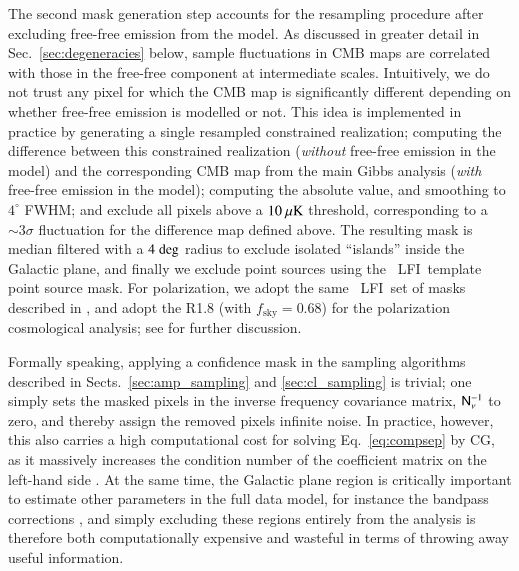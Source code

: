 \documentclass[twocolumn]{aa}
\newcommand{\N}[0]{\tens{N}}
\newcommand{\lfi}[0]{LFI}
\begin{document}
The second mask generation step accounts for the resampling procedure
after excluding free-free emission from the model. As discussed in greater detail in Sec.~\ref{sec:degeneracies} below, sample fluctuations in CMB maps are correlated with those in the free-free component at intermediate scales. Intuitively, we do 
not trust any pixel for which the CMB map is significantly different
depending on whether free-free emission is modelled or not. This idea
is implemented in practice by generating a single resampled
constrained realization; computing the difference between this
constrained realization (\emph{without} free-free emission in the
model) and the corresponding CMB map from the main Gibbs analysis
(\emph{with} free-free emission in the model); computing the absolute
value, and smoothing to $4^{\circ}$ FWHM; and exclude all pixels above
a $10\:\mu\rm{K}$ threshold, corresponding to a $\sim 3\sigma$ fluctuation for the difference map defined above. The resulting mask is median filtered
with a $4\;\rm{deg}$ radius to exclude isolated ``islands'' inside the
Galactic plane, and finally we exclude point sources using the
\Planck\ \lfi\ template point source mask. For polarization, we adopt
the same \Planck\ \lfi\ set of masks described in
\citet{planck2016-l05}, and adopt the R1.8 (with
$f_{\mathrm{sky}}=0.68$) for the polarization cosmological analysis;
see \cite{bp12} for further discussion.

Formally speaking, applying a confidence mask in the sampling
algorithms described in Sects.~\ref{sec:amp_sampling} and
\ref{sec:cl_sampling} is trivial; one simply sets the masked pixels in
the inverse frequency covariance matrix, $\N_{\nu}^{-1}$ to zero, and
thereby assign the removed pixels infinite noise. In practice,
however, this also carries a high computational cost for solving
Eq.~\eqref{eq:compsep} by CG, as it massively increases the condition
number of the coefficient matrix on the left-hand side
\citep{seljebotn:2019}. At the same time, the Galactic plane region is
critically important to estimate other parameters in the full data
model, for instance the bandpass corrections \citep{bp09}, and simply
excluding these regions entirely from the analysis is therefore both
computationally expensive and wasteful in terms of throwing away
useful information.
\end{document}

